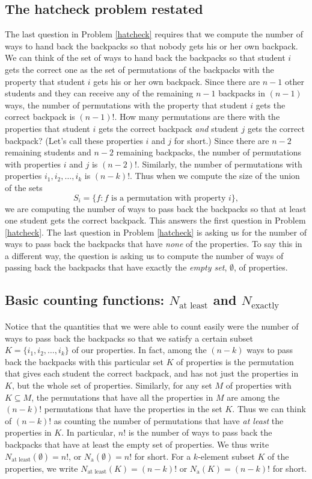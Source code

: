 \subsection{The hatcheck problem restated}  The last question in Problem
\ref{hatcheck} requires that we compute the number of ways to hand back
the backpacks so that nobody gets his or her own backpack.  We can think
of the set of ways to hand back the backpacks so that student $i$ gets
the correct one as the set of permutations of the backpacks with the
property that student $i$ gets his or her own backpack.  Since there are
$n-1$ other students and they can receive any of the remaining $n-1$
backpacks in $(n-1)$ ways, the number of permutations with the property
that student $i$ gets the correct backpack is $(n-1)!$. How many
permutations are there with the properties that student $i$ gets the
correct backpack {\em and} student $j$ gets the correct backpack?  (Let's
call these properties $i$ and $j$ for short.)  Since there are $n-2$
remaining students and $n-2$ remaining backpacks, the number of
permutations with properties $i$ and $j$ is $(n-2)!$.  Similarly, the
number of permutations with properties $i_1,i_2,\ldots,i_k$ is $(n-k)!$. 
Thus when we compute the size of the union of the sets
$$S_i=\{f: f\mbox{ is a permutation with property }i\},$$ we are
computing the number of ways to pass back the backpacks so that at least
one student gets the correct backpack.  This answers the first question
in Problem \ref{hatcheck}.  The last question in Problem \ref{hatcheck}
is asking us for the number of ways to pass back the backpacks that have
{\em none} of the properties.  To say this in a different way, the
question is asking us to compute the number of ways of passing back the
backpacks that have exactly the {\em empty set}, $\emptyset$, of
properties.  

\subsection{Basic counting functions: $N_{\mbox{at least}}$ and
$N_{\mbox{exactly}}$}
Notice that the quantities that we were able to count easily were the
number of ways to pass back the backpacks so that we satisfy a certain
subset
$K= \{i_1,i_2,\ldots,i_k\}$ of our properties.  In fact, among the $(n-k)$
ways to pass back the backpacks with this particular set $K$ of
properties is the permutation that gives each student the correct
backpack, and has not just the properties in $K$, but the whole set of
properties.  Similarly, for any set $M$ of properties with $K\subseteq
M$, the permutations that have all the properties in $M$ are among the
$(n-k)!$ permutations that have the properties in the set $K$.  Thus we
can think of $(n-k)!$ as counting the number of permutations that have
{\em at least} the properties in $K$.  In particular, $n!$ is the number
of ways to pass back the backpacks that have at least the empty set of
properties.  We thus write $N_{\mbox{at least}}(\emptyset)=n!$, or
$N_{\mbox{a}}(\emptyset)=n!$ for short.  For a $k$-element subset $K$ of
the properties, we write $N_{\mbox{at least}}(K) =(n-k)!$ or
$N_{\mbox{a}}(K) =(n-k)!$ for short.


